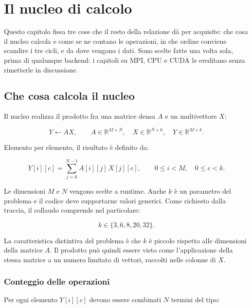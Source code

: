 \chapter{Il nucleo di calcolo}\label{cap:problema}

Questo capitolo fissa tre cose che il resto della relazione dà per acquisite:
che cosa il nucleo calcola e come se ne contano le operazioni, in che ordine
conviene scandire i tre cicli, e da dove vengono i dati. Sono scelte fatte una
volta sola, prima di qualunque backend: i capitoli su MPI, CPU e CUDA le
ereditano senza rimetterle in discussione.

\section{Che cosa calcola il nucleo}
\label{sec:definizione}

Il nucleo realizza il prodotto fra una matrice densa $A$ e un
multivettore $X$:

\begin{equation}
    Y \leftarrow AX,
    \qquad
    A \in \mathbb{R}^{M\times N},
    \quad
    X \in \mathbb{R}^{N\times k},
    \quad
    Y \in \mathbb{R}^{M\times k}.
    \label{eq:problema-nucleo}
\end{equation}

Elemento per elemento, il risultato è definito da:

\begin{equation}
    Y[i][c]
    =
    \sum_{j=0}^{N-1} A[i][j]\,X[j][c],
    \qquad
    0 \le i < M,
    \quad
    0 \le c < k.
    \label{eq:definizione}
\end{equation}

Le dimensioni $M$ e $N$ vengono scelte a runtime. Anche $k$ è un parametro
del problema e il codice deve supportarne valori generici. Come richiesto
dalla traccia, il collaudo comprende nel particolare:

\[
k \in \{3,6,8,20,32\}.
\]

La caratteristica distintiva del problema è che $k$ è piccolo rispetto
alle dimensioni della matrice $A$. Il prodotto può quindi essere visto come
l'applicazione della stessa matrice a un numero limitato di vettori,
raccolti nelle colonne di $X$.

\subsection{Conteggio delle operazioni}

Per ogni elemento $Y[i][c]$ devono essere combinati $N$ termini del tipo:

